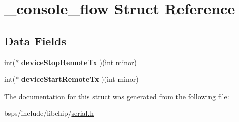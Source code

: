 \hypertarget{struct__console__flow}{}\section{\+\_\+console\+\_\+flow Struct Reference}
\label{struct__console__flow}
\subsection*{Data Fields}
\begin{DoxyCompactItemize}
\item 
\mbox{\label{struct__console__flow_aa280e0b7a2ce0432cbd2121a6cf68b98}} 
int($\ast$ {\bfseries device\+Stop\+Remote\+Tx} )(int minor)
\item 
\mbox{\label{struct__console__flow_ac63778f44e08bcbf16caaafa3a28b2ea}} 
int($\ast$ {\bfseries device\+Start\+Remote\+Tx} )(int minor)
\end{DoxyCompactItemize}


The documentation for this struct was generated from the following file\+:\begin{DoxyCompactItemize}
\item 
bsps/include/libchip/\mbox{\hyperlink{serial_8h}{serial.\+h}}\end{DoxyCompactItemize}
